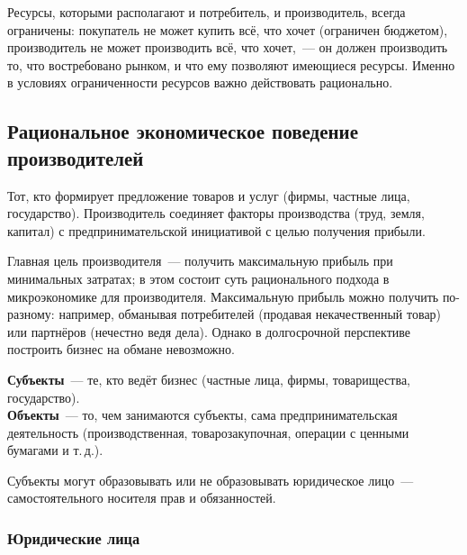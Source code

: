 \documentclass[12pt]{article}
\begin{document}
    \begin{note}
    	Ресурсы, которыми располагают и потребитель, и производитель, всегда ограничены: покупатель не может купить всё, что хочет (ограничен бюджетом), производитель не может производить всё, что хочет,~--- он должен производить то, что востребовано рынком, и что ему позволяют имеющиеся ресурсы. Именно в условиях ограниченности ресурсов важно действовать рационально.
    \end{note}
    
    \subsection{Рациональное экономическое поведение производителей}
    
    \begin{definition}[Производитель]
    	Тот, кто формирует предложение товаров и услуг (фирмы, частные лица, государство). Производитель соединяет факторы производства (труд, земля, капитал) с предпринимательской инициативой с целью получения прибыли.
    \end{definition}
    
    \begin{note}
    	Главная цель производителя~--- получить максимальную прибыль при минимальных затратах; в этом состоит суть рационального подхода в микроэкономике для производителя. Максимальную прибыль можно получить по-разному: например, обманывая потребителей (продавая некачественный товар) или партнёров (нечестно ведя дела). Однако в долгосрочной перспективе построить бизнес на обмане невозможно.
    \end{note}
    
    \begin{definition}
    	\textbf{Субъекты}~--- те, кто ведёт бизнес (частные лица, фирмы, товарищества, государство).\\
    	\textbf{Объекты}~--- то, чем занимаются субъекты, сама предпринимательская деятельность (производственная, товарозакупочная, операции с ценными бумагами и т.\,д.).
    \end{definition}
    
    \begin{note}
    	Субъекты могут образовывать или не образовывать юридическое лицо~--- самостоятельного носителя прав и обязанностей.
    \end{note}
    
    \subsubsection{Юридические лица}
    
\end{document}
